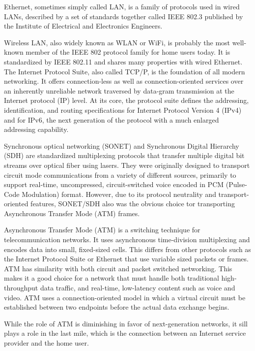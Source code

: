 \documentclass[a4paper]{article}
\begin{document}
\begin{enumerate}[label={\textbf{\Roman*.}},leftmargin=0pt,itemindent=*]
    Ethernet, sometimes simply called LAN, is a family of protocols used in
    wired LANs, described by a set of standards together called IEEE 802.3
    published by the Institute of Electrical and Electronics Engineers.

    Wireless LAN, also widely known as WLAN or WiFi, is probably the most
    well-known member of the IEEE 802 protocol family for home users today. It
    is standardized by IEEE 802.11 and shares many properties with wired
    Ethernet. The Internet Protocol Suite, also called TCP/P, is the foundation
    of all modern networking. It offers connection-less as well as
    connection-oriented services over an inherently unreliable network traversed
    by data-gram transmission at the Internet protocol (IP) level. At its core,
    the protocol suite defines the addressing, identification, and routing
    specifications for Internet Protocol Version 4 (IPv4) and for IPv6, the next
    generation of the protocol with a much enlarged addressing capability.

    Synchronous optical networking (SONET) and Synchronous Digital Hierarchy
    (SDH) are standardized multiplexing protocols that transfer multiple digital
    bit streams over optical fiber using lasers. They were originally designed
    to transport circuit mode communications from a variety of different
    sources, primarily to support real-time, uncompressed, circuit-switched voice
    encoded in PCM (Pulse-Code Modulation) format. However, due to its protocol
    neutrality and transport-oriented features, SONET/SDH also was the obvious
    choice tor transporting Asynchronous Transfer Mode (ATM) frames.

    Asynchronous Transfer Mode (ATM) is a switching technique for
    telecommunication networks. It uses asynchronous time-division multiplexing
    and encodes data into small, fixed-sized cells. This differs from other
    protocols such as the Internet Protocol Suite or Ethernet that use variable
    sized packets or frames. ATM has similarity with both circuit and packet
    switched networking. This makes it a good choice for a network that must
    handle both traditional high-throughput data traffic, and real-time,
    low-latency content such as voice and video. ATM uses a connection-oriented
    model in which a virtual circuit must be established between two endpoints
    before the actual data exchange begins.

    While the role of ATM is diminishing in favor of next-generation networks,
    it sill plays a role in the last mile, which is the connection between an
    Internet service provider and the home user.


\end{enumerate}
\end{document}
